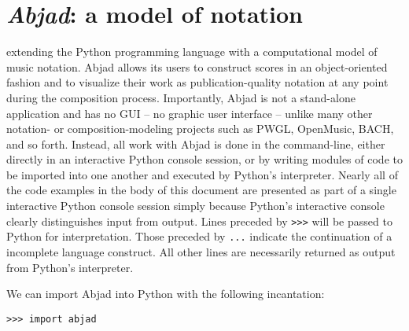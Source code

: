 \chapter{\emph{Abjad}: a model of notation}
\label{chap:a-model-of-notation}

 extending the Python
programming language with a computational model of music notation. Abjad allows
its users to construct scores in an object-oriented fashion and to visualize
their work as publication-quality notation at any point during the composition
process. Importantly, Abjad is not a stand-alone application and has no GUI --
no graphic user interface -- unlike many other notation- or
composition-modeling projects such as PWGL\cite{laurson2009qf,
kuuskankare2004recent}, OpenMusic\cite{assayag1999sw},
BACH\cite{agostini2013real}, and so forth. Instead, all work with Abjad is done
in the command-line, either directly in an interactive Python console session,
or by writing modules of code to be imported into one another and executed by
Python's interpreter. Nearly all of the code examples in the body of this
document are presented as part of a single interactive Python console session
simply because Python's interactive console clearly distinguishes input from
output. Lines preceded by \texttt{>>>} will be passed to Python for
interpretation. Those preceded by \texttt{...} indicate the continuation of a
incomplete language construct. All other lines are necessarily returned as
output from Python's interpreter.

We can import Abjad into Python with the following incantation:

\begin{comment}
<abjad>
import abjad
</abjad>
\end{comment}

\begin{abjadbookoutput}
\begin{singlespacing}
\vspace{-0.5\baselineskip}
\begin{verbatim}
>>> import abjad
\end{verbatim}
\end{singlespacing}
\end{abjadbookoutput}

